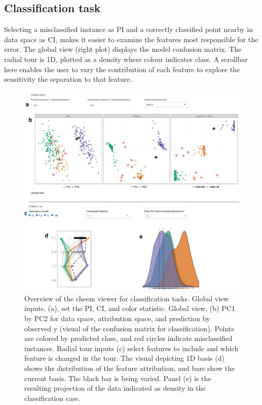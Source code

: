 \documentclass[
]{article}
\begin{document}
\hypertarget{classification-task}{%
\subsection{Classification task}\label{classification-task}}

Selecting a misclassified instance as PI and a correctly classified point nearby in data space as CI, makes it easier to examine the features most responsible for the error. The global view (right plot) displays the model confusion matrix. The radial tour is 1D, plotted as a density where colour indicates class. A scrollbar here enables the user to vary the contribution of each feature to explore the sensitivity the separation to that feature.

\begin{figure}

{\centering \includegraphics[width=1\linewidth]{./figures/app_classification} 

}

\caption{Overview of the cheem viewer for classification tasks. Global view inputs, (a), set the PI, CI, and color statistic. Global view, (b) PC1 by PC2 for data space, attribution space, and prediction by observed y (visual of the confusion matrix for classification). Points are colored by predicted class, and red circles indicate misclassified instances. Radial tour inputs (c) select features to include and which feature is changed in the tour. The visual depicting 1D basis (d) shows the distribution of the feature attribution, and bars show the current basis. The black bar is being varied. Panel (e) is the resulting projection of the data indicated as density in the classification case.}\label{fig:classificationcase}
\end{figure}
\end{document}

